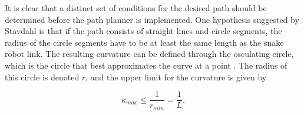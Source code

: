 It is clear that a distinct set of conditions for the desired path should be determined before the path planner is implemented. One hypothesis suggested by Stavdahl \cite{StavdahlNote} is that if the path consists of straight lines and circle segments, the radius of the circle segments have to be at least the same length as the snake robot link. The resulting curvature can be defined through the osculating circle, which is the circle that best approximates the curve at a point \cite{kline1998calculus}. The radius of this circle is denoted $r$, and the upper limit for the curvature is given by

\begin{equation}
    \kappa_{max} \leq \frac{1}{r_{min}} = \frac{1}{L}.
\end{equation}